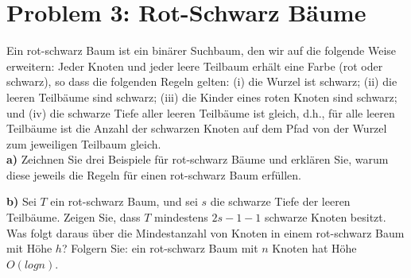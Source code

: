 \section*{{Problem 3: Rot-Schwarz Bäume}} 

Ein rot-schwarz Baum ist ein binärer Suchbaum, den wir auf die folgende Weise erweitern: Jeder Knoten und jeder leere Teilbaum erhält eine Farbe (rot oder schwarz), so dass die folgenden Regeln gelten: (i) die Wurzel ist schwarz; (ii) die leeren Teilbäume sind schwarz; (iii) die Kinder eines roten Knoten sind schwarz; und (iv) die schwarze Tiefe aller leeren Teilbäume ist gleich, d.h., für alle leeren Teilbäume ist die Anzahl der schwarzen Knoten auf dem Pfad von der Wurzel zum jeweiligen Teilbaum gleich.\\

\noindent
\textbf{a)} Zeichnen Sie drei Beispiele für rot-schwarz Bäume und erklären Sie, warum diese jeweils die Regeln für einen rot-schwarz Baum erfüllen.

\noindent
\textbf{b)} Sei $T$ ein rot-schwarz Baum, und sei $s$ die schwarze Tiefe der leeren Teilbäume. Zeigen Sie, dass $T$ mindestens $2s-1 - 1$ schwarze Knoten besitzt. Was folgt daraus über die Mindestanzahl von Knoten in einem rot-schwarz Baum mit Höhe $h$? Folgern Sie: ein rot-schwarz Baum mit $n$ Knoten hat Höhe $O(log n)$.\\